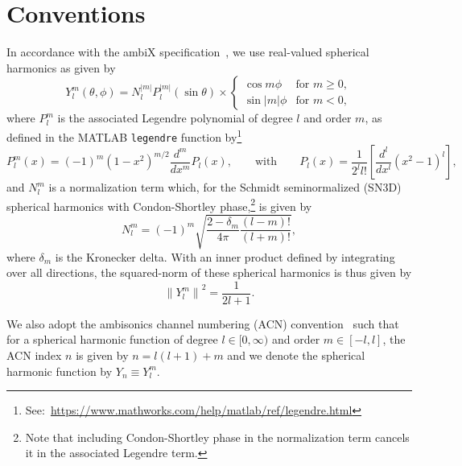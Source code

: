 \documentclass[11pt, oneside]{article}
\begin{document}
\section{Conventions}\label{sec:Conventions}
In accordance with the ambiX specification~\citep{Nachbar2011},
we use real-valued spherical harmonics as given by
\begin{equation*}
Y_l^m(\theta,\phi) = N_l^{|m|} P_l^{|m|} (\sin \theta) \times \left\{
    \begin{array}{cl}
	\cos m \phi & \textrm{for } m \geq 0,\\[8pt]
	\sin |m| \phi & \textrm{for } m < 0,
    \end{array}\right.
\end{equation*}
where $P_l^m$ is the associated Legendre polynomial of degree $l$ and order $m$,
as defined in the MATLAB \texttt{legendre} function by\footnote{See:~\url{https://www.mathworks.com/help/matlab/ref/legendre.html}}
\begin{equation*}
P_l^m(x) = (-1)^m (1 - x^2)^{m/2} \frac{d^m}{dx^m} P_l(x), 
\quad\quad \textrm{with} \quad\quad
P_l(x) = \frac{1}{2^l l!} \left[ \frac{d^l}{dx^l}(x^2 - 1)^l \right],
\end{equation*}
and $N_l^m$ is a normalization term which, for the Schmidt seminormalized (SN3D)
spherical harmonics with Condon-Shortley phase,\footnote{Note that including
Condon-Shortley phase in the normalization term cancels it in the associated Legendre term.}
is given by~\citep{Nachbar2011}
\begin{equation*}
N_l^m = (-1)^m \sqrt{\frac{2 - \delta_m}{4 \pi} \frac{(l-m)!}{(l+m)!}},
\end{equation*}
where $\delta_m$ is the Kronecker delta.
With an inner product defined by integrating over all directions, the squared-norm of these spherical harmonics is thus given by
\begin{equation*}
\left\| Y_l^m \right\|^2 = \frac{1}{2 l + 1}.
\end{equation*}

We also adopt the ambisonics channel numbering (ACN) convention~\citep{Nachbar2011}
such that for a spherical harmonic function of degree $l \in [0,\infty)$ and order $m \in [-l,l]$,
the ACN index $n$ is given by $n = l (l + 1) + m$ and we denote the spherical harmonic function by $Y_n \equiv Y_l^m$.

\end{document}
